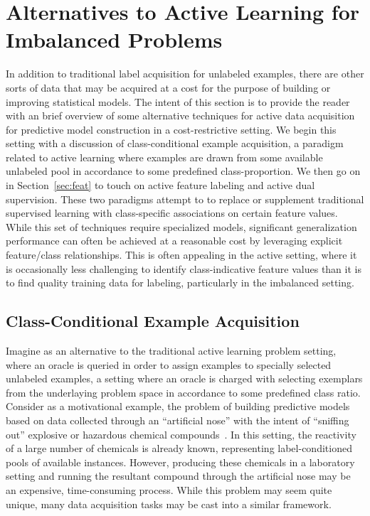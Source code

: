 \section{Alternatives to Active Learning for Imbalanced Problems}
\label{sec:other_settings}
In addition to traditional label acquisition for unlabeled examples, there are other sorts of data that may be acquired at a cost for the purpose of building or improving statistical models. The intent of this section is to provide the reader with an brief overview of some alternative techniques for active data acquisition for predictive model construction in a cost-restrictive setting. We begin this setting with a discussion of class-conditional example acquisition, a paradigm related to active learning where examples are drawn from some available unlabeled pool in accordance to some predefined class-proportion. We then go on in Section~\ref{sec:feat} to touch on active feature labeling and  active dual supervision. These two paradigms attempt to to replace or supplement traditional supervised learning with class-specific associations on certain feature values. While this set of techniques require specialized models, significant generalization performance can often be achieved at a reasonable cost by leveraging explicit feature/class relationships. This is often appealing in the active setting, where it is occasionally less challenging to identify class-indicative feature values than it is to find quality training data for labeling, particularly in the imbalanced setting.

\subsection{Class-Conditional Example Acquisition}
\label{sec:acs}

Imagine as an alternative to the traditional active learning problem setting, where an oracle is queried in order to assign examples to specially selected unlabeled examples, a setting where an oracle is charged with selecting exemplars from the underlaying problem space in accordance to some predefined class ratio. Consider as a motivational example, the problem of building predictive models based on data collected through an ``artificial nose'' with the intent of ``sniffing out'' explosive or hazardous chemical compounds~\cite{lomasky:ecml2007, lomaskyThesis, lomasky:nose2006}. In this setting, the reactivity of a large number of chemicals is already known, representing label-conditioned pools of available instances. However, producing these chemicals in a laboratory setting and running the resultant compound through the artificial nose may be an expensive, time-consuming process. While this problem may seem quite unique, many data acquisition tasks may be cast into a similar framework.


